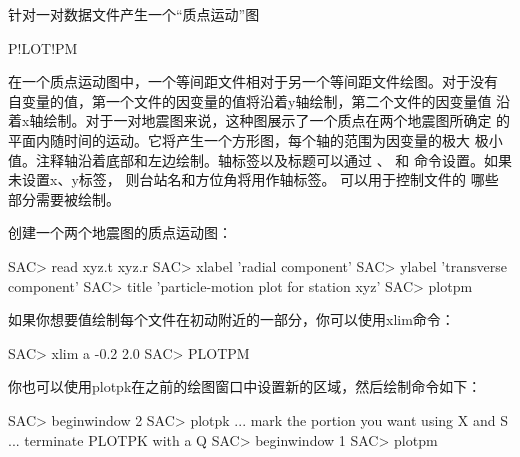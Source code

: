 \label{cmd:plotpm}

针对一对数据文件产生一个``质点运动''图

\begin{SACSTX}
P!LOT!PM
\end{SACSTX}

在一个质点运动图中，一个等间距文件相对于另一个等间距文件绘图。对于没有
自变量的值，第一个文件的因变量的值将沿着y轴绘制，第二个文件的因变量值
沿着x轴绘制。对于一对地震图来说，这种图展示了一个质点在两个地震图所确定
的平面内随时间的运动。它将产生一个方形图，每个轴的范围为因变量的极大
极小值。注释轴沿着底部和左边绘制。轴标签以及标题可以通过 、
 和  命令设置。如果未设置x、y标签，
则台站名和方位角将用作轴标签。 可以用于控制文件的
哪些部分需要被绘制。

创建一个两个地震图的质点运动图：
\begin{SACCode}
SAC> read xyz.t xyz.r
SAC> xlabel 'radial component'
SAC> ylabel 'transverse component'
SAC> title 'particle-motion plot for station xyz'
SAC> plotpm
\end{SACCode}

如果你想要值绘制每个文件在初动附近的一部分，你可以使用xlim命令：
\begin{SACCode}
SAC> xlim a -0.2 2.0
SAC> PLOTPM
\end{SACCode}

你也可以使用plotpk在之前的绘图窗口中设置新的区域，然后绘制命令如下：
\begin{SACCode}
SAC> beginwindow 2
SAC> plotpk
 ... mark the portion you want using X and S
 ... terminate PLOTPK with a Q
SAC> beginwindow 1
SAC> plotpm
\end{SACCode}
